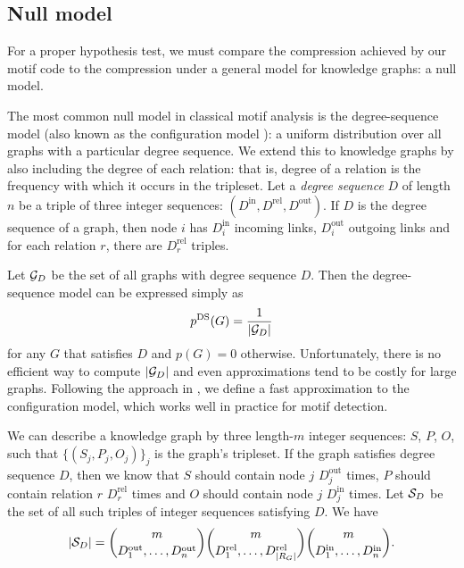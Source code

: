 \documentclass[runningheads]{style/llncs}
\newcommand{\G}{{\cal G}}
\begin{document}

\subsection{Null model}

For a proper hypothesis test, we must compare the compression achieved by our motif code to the compression under a general model for knowledge graphs: a null model. 

The most common null model in classical motif analysis is the degree-sequence model (also known as the configuration model \cite{newman2010networks}): a uniform distribution over all graphs with a particular degree sequence. We extend this to knowledge graphs by also including the degree of each relation: that is, degree of a relation is the frequency with which it occurs in the tripleset. Let a \emph{degree sequence} $D$ of length $n$ be a triple of three integer sequences: $(D^\text{in}, D^\text{rel}, D^\text{out})$. If $D$ is the degree sequence of a graph, then node $i$ has $D^\text{in}_i$ incoming links,  $D^\text{out}_i$ outgoing links and for each relation $r$, there are $D^\text{rel}_r$ triples.

Let $\G_D$ be the set of all graphs with degree sequence $D$. Then the degree-sequence model can be expressed simply as
\[
p^\text{DS}(G) = \frac{1}{|\G_D|}
\]
for any $G$ that satisfies $D$ and $p(G) = 0$ otherwise. Unfortunately, there is no efficient way to compute $|\G_D|$ and even approximations tend to be costly for large graphs. Following the approach in \cite{bloem2017large}, we define a fast approximation to the configuration model, which works well in practice for motif detection. 

We can describe a knowledge graph by three length-$m$ integer sequences: $S$, $P$, $O$, such that $\{(S_j, P_j, O_j)\}_j$ is the graph's tripleset. If the graph satisfies degree sequence $D$, then we know that $S$ should contain node $j$ $D^\text{out}_j$ times, $P$ should contain relation $r$ $D^\text{rel}_r$ times and $O$ should contain node $j$ $D^\text{in}_j$ times.  Let ${\cal S}_D$ be the set of all such triples of integer sequences satisfying $D$. We have 
\[
|{\cal S}_D| =
 {m \choose {D_1^\text{out}, \ldots, D_n^\text{out}} }
 {m \choose {D_1^\text{rel}, \ldots, D_{|R_G|}^\text{rel}} }
 {m \choose {D_1^\text{in}, \ldots, D_n^\text{in}} } \text{.}
\]
\end{document}
